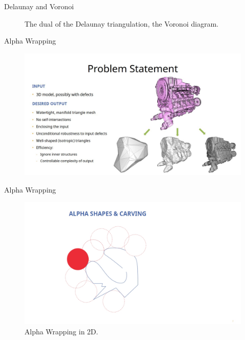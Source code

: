\documentclass[10pt]{beamer}
\begin{document}
\begin{frame}{Delaunay and Voronoi}
\begin{figure}[H]
\begin{minipage}{0.49\textwidth}
        \caption{The dual of the Delaunay triangulation, the Voronoi diagram.}
    \end{minipage}
  \end{figure}
\end{frame}



\begin{frame}{Alpha Wrapping}
  \begin{figure}[H]
    \hspace*{-1cm}
    \includegraphics[width=1.2\textwidth]{images/alpha-wrapping.jpg}
  \end{figure}
\end{frame}

\begin{frame}{Alpha Wrapping}
  \begin{figure}[H]
    \centering
    \includegraphics[width=1.1\textwidth]{images/alpha-wrapping1.jpg}
    \caption{Alpha Wrapping in 2D.}
\end{figure}
\end{frame}
\end{document}

